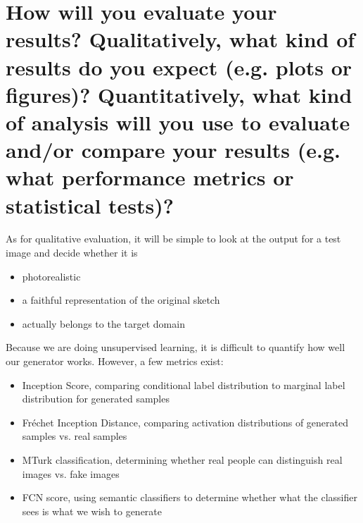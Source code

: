 \documentclass{article}
\begin{document}
\section{How will you evaluate your results? Qualitatively, what kind of results do you expect (e.g. plots or figures)? Quantitatively, what kind of analysis will you use to evaluate and/or compare your results (e.g. what performance metrics or statistical tests)? }

As for qualitative evaluation, it will be simple to look at the output for a test image and decide whether it is 
\begin{itemize}
\item photorealistic
\item a faithful representation of the original sketch
\item actually belongs to the target domain
\end{itemize}

Because we are doing unsupervised learning, it is difficult to quantify how well our generator works. However, a few metrics exist:
\begin{itemize}
\item Inception Score, comparing conditional label distribution to marginal label distribution for generated samples
\item Fr\'echet Inception Distance, comparing activation distributions of generated samples vs. real samples
\item MTurk classification, determining whether real people can distinguish real images vs. fake images
\item FCN score, using semantic classifiers to determine whether what the classifier sees is what we wish to generate
\end{itemize}



\end{document}
